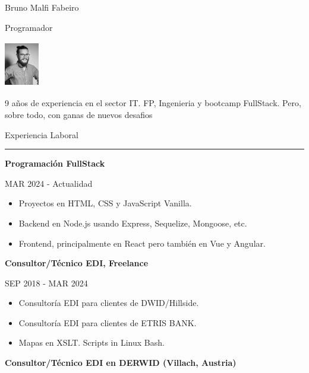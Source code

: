 \documentclass{letter}
\begin{document}
\begin{minipage}[t]{0.60\textwidth}
\setlength{\baselineskip}{1.5\baselineskip}
\vspace{0.8cm}

\begin{minipage}{0.8\linewidth} 
    {\huge Bruno Malfi Fabeiro}

    {\large Programador}
\end{minipage}
\begin{minipage}{0.1\linewidth}
    \includegraphics[width=1.5cm, height=2cm]{foto2.jpg}
\end{minipage}

\vspace{0.2cm}
 
9 años de experiencia en el sector IT. 
FP, Ingenieria y bootcamp FullStack.
Pero, sobre todo, con ganas de nuevos desafios

\vspace{0.5cm}

{\large Experiencia Laboral}
\rule{\linewidth}{0.4pt}
{\large \textbf{Programación FullStack}}

{\small MAR 2024 - Actualidad}

\begin{itemize}
    \item Proyectos en HTML, CSS y JavaScript Vanilla.
    \item  Backend en Node.js usando Express, Sequelize, Mongoose, etc.
    \item  Frontend, principalmente en React pero también en Vue y Angular.
\end{itemize}

{\large \textbf{Consultor/Técnico EDI, Freelance}}

{\small SEP 2018 - MAR 2024}

\begin{itemize}
    \item Consultoría EDI para clientes de DWID/Hillside.
    \item Consultoría EDI para clientes de ETRIS BANK.
    \item Mapas en XSLT. Scripts in Linux Bash.
\end{itemize}


{\large \textbf{Consultor/Técnico EDI en DERWID (Villach, Austria)}}


\end{minipage}
\end{document}
